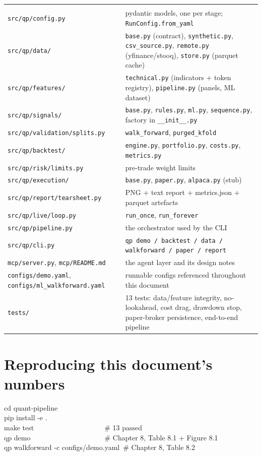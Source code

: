 \begin{longtable}{L{5.0cm} L{9.6cm}}
\toprule
{} &  \\
\midrule
\endfirsthead
\toprule
{} &  \\
\midrule
\endhead
\bottomrule
\endfoot
\texttt{src/qp/config.py} & pydantic models, one per stage; \texttt{RunConfig.from\_yaml} \\
\texttt{src/qp/data/} & \texttt{base.py} (contract), \texttt{synthetic.py}, \texttt{csv\_source.py}, \texttt{remote.py} (yfinance/stooq), \texttt{store.py} (parquet cache) \\
\texttt{src/qp/features/} & \texttt{technical.py} (indicators + token registry), \texttt{pipeline.py} (panels, ML dataset) \\
\texttt{src/qp/signals/} & \texttt{base.py}, \texttt{rules.py}, \texttt{ml.py}, \texttt{sequence.py}, factory in \texttt{\_\_init\_\_.py} \\
\texttt{src/qp/validation/splits.py} & \texttt{walk\_forward}, \texttt{purged\_kfold} \\
\texttt{src/qp/backtest/} & \texttt{engine.py}, \texttt{portfolio.py}, \texttt{costs.py}, \texttt{metrics.py} \\
\texttt{src/qp/risk/limits.py} & pre-trade weight limits \\
\texttt{src/qp/execution/} & \texttt{base.py}, \texttt{paper.py}, \texttt{alpaca.py} (stub) \\
\texttt{src/qp/report/tearsheet.py} & PNG + text report + metrics.json + parquet artefacts \\
\texttt{src/qp/live/loop.py} & \texttt{run\_once}, \texttt{run\_forever} \\
\texttt{src/qp/pipeline.py} & the orchestrator used by the CLI \\
\texttt{src/qp/cli.py} & \texttt{qp demo / backtest / data / walkforward / paper / report} \\
\texttt{mcp/server.py}, \texttt{mcp/README.md} & the agent layer and its design notes \\
\texttt{configs/demo.yaml}, \texttt{configs/ml\_walkforward.yaml} & runnable configs referenced throughout this document \\
\texttt{tests/} & 13 tests: data/feature integrity, no-lookahead, cost drag, drawdown stop, paper-broker persistence, end-to-end pipeline \\
\end{longtable}

\section{Reproducing this document's numbers}

\begin{cli}
cd quant-pipeline\\
pip install -e .\\
make test\ \ \ \ \ \ \ \ \ \ \ \ \ \ \ \ \ \ \ \ \# 13 passed\\
qp demo\ \ \ \ \ \ \ \ \ \ \ \ \ \ \ \ \ \ \ \ \ \# Chapter 8, Table 8.1 + Figure 8.1\\
qp walkforward -c configs/demo.yaml\ \# Chapter 8, Table 8.2
\end{cli}
